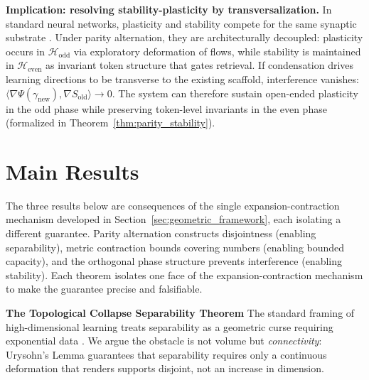 \documentclass{article}
\newcommand{\Heven}{\mathcal{H}_{\text{even}}}
\newcommand{\Hodd}{\mathcal{H}_{\text{odd}}}
\begin{document}
\noindent\textbf{Implication: resolving stability-plasticity by transversalization.}
In standard neural networks, plasticity and stability compete for the same synaptic substrate \cite{mccloskey1989catastrophic}. Under parity alternation, they are architecturally decoupled: plasticity occurs in $\Hodd$ via exploratory deformation of flows, while stability is maintained in $\Heven$ as invariant token structure that gates retrieval. If condensation drives learning directions to be transverse to the existing scaffold, interference vanishes:
$\langle \nabla \Psi(\gamma_{\text{new}}), \nabla S_{\text{old}} \rangle \rightarrow 0$.
The system can therefore sustain open-ended plasticity in the odd phase while preserving token-level invariants in the even phase (formalized in Theorem~\ref{thm:parity_stability}).
 

 
\section{Main Results}
 
The three results below are consequences of the single expansion-contraction mechanism developed in Section~\ref{sec:geometric_framework}, each isolating a different guarantee. Parity alternation constructs disjointness (enabling separability), metric contraction bounds covering numbers (enabling bounded capacity), and the orthogonal phase structure prevents interference (enabling stability). Each theorem isolates one face of the expansion-contraction mechanism to make the guarantee precise and falsifiable.

 
 
\noindent\textbf{The Topological Collapse Separability Theorem}
The standard framing of high-dimensional learning treats separability as a geometric curse requiring exponential data \cite{bellman1957dynamic}. We argue the obstacle is not volume but \emph{connectivity}: Urysohn's Lemma guarantees that separability requires only a continuous deformation that renders supports disjoint, not an increase in dimension.
 
\end{document}
